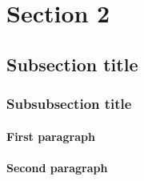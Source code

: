 \section{Section 2}\label{sec:section2}

\lipsum[2-4]

\subsection{Subsection title}\label{subsec:title}
\lipsum[2-2]
\subsubsection{Subsubsection title}\label{subsubsec:title}
\lipsum[3-3]
\paragraph{First paragraph}
\lipsum[4-4]
\paragraph{Second paragraph}
\lipsum[5-5]
